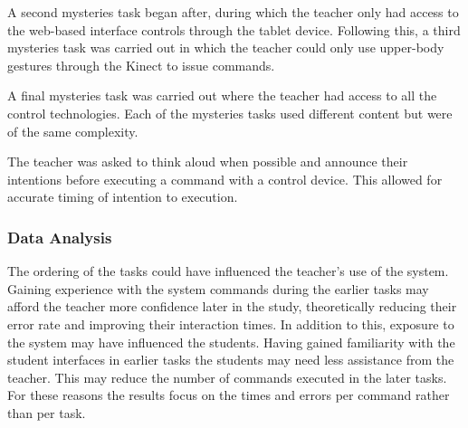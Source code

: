 \documentclass[link]{IWCOMP}
\begin{document}
A second mysteries task began after, during which the teacher only had access to the web-based interface controls through the tablet device.
Following this, a third mysteries task was carried out in which the teacher could only use upper-body gestures through the Kinect to issue commands.

A final mysteries task was carried out where the teacher had access to all the control technologies.  
Each of the mysteries tasks used different content but were of the same complexity.  

The teacher was asked to think aloud when possible and announce their intentions before executing a command with a control device.  
This allowed for accurate timing of intention to execution.

\subsubsection{Data Analysis}
\label{subsec:studyPhase1Analysis}

The ordering of the tasks could have influenced the teacher's use of the system.
Gaining experience with the system commands during the earlier tasks may afford the teacher more confidence later in the study, theoretically reducing their error rate and improving their interaction times.
In addition to this, exposure to the system may have influenced the students.
Having gained familiarity with the student interfaces in earlier tasks the students may need less assistance from the teacher.
This may reduce the number of commands executed in the later tasks.
For these reasons the results focus on the times and errors per command rather than per task.
\end{document}
